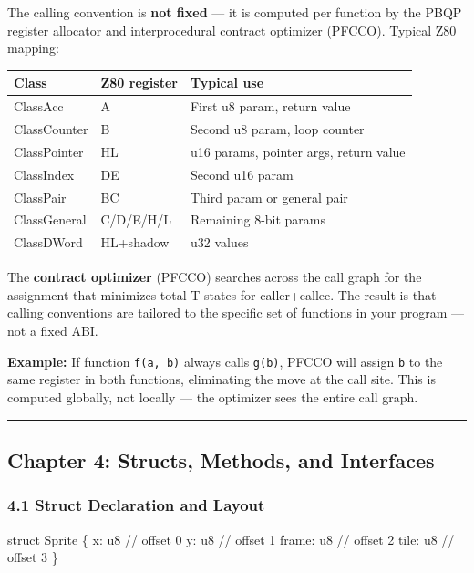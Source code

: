 \documentclass[
  11pt,
]{article}
\newenvironment{Shaded}{}{}
\newcommand{\NormalTok}[1]{#1}
\begin{document}
The calling convention is \textbf{not fixed} --- it is computed per
function by the PBQP register allocator and interprocedural contract
optimizer (PFCCO). Typical Z80 mapping:

\begin{longtable}[]{@{}lll@{}}
\toprule\noalign{}
Class & Z80 register & Typical use \\
\midrule\noalign{}
\endhead
\bottomrule\noalign{}
\endlastfoot
ClassAcc & A & First u8 param, return value \\
ClassCounter & B & Second u8 param, loop counter \\
ClassPointer & HL & u16 params, pointer args, return value \\
ClassIndex & DE & Second u16 param \\
ClassPair & BC & Third param or general pair \\
ClassGeneral & C/D/E/H/L & Remaining 8-bit params \\
ClassDWord & HL+shadow & u32 values \\
\end{longtable}

The \textbf{contract optimizer} (PFCCO) searches across the call graph
for the assignment that minimizes total T-states for caller+callee. The
result is that calling conventions are tailored to the specific set of
functions in your program --- not a fixed ABI.

\textbf{Example:} If function \texttt{f(a,\ b)} always calls
\texttt{g(b)}, PFCCO will assign \texttt{b} to the same register in both
functions, eliminating the move at the call site. This is computed
globally, not locally --- the optimizer sees the entire call graph.

\begin{center}\rule{0.5\linewidth}{0.5pt}\end{center}

\subsection{Chapter 4: Structs, Methods, and
Interfaces}\label{chapter-4-structs-methods-and-interfaces}

\subsubsection{4.1 Struct Declaration and
Layout}\label{struct-declaration-and-layout}

\begin{Shaded}
\begin{Highlighting}[]
\NormalTok{struct Sprite \{}
\NormalTok{    x: u8       // offset 0}
\NormalTok{    y: u8       // offset 1}
\NormalTok{    frame: u8   // offset 2}
\NormalTok{    tile: u8    // offset 3}
\NormalTok{\}}
\end{Highlighting}
\end{Shaded}
\end{document}
